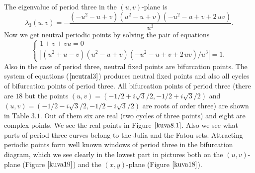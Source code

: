 \documentclass[12pt,a4paper]{amsart}
\numberwithin{equation}{section}
\numberwithin{lause}{section}
\begin{document}
The eigenvalue of period three in the $(u,v)$-plane is
\begin{displaymath}
\lambda_{3}(u,v)=-{\frac {\left (-{u}^{2}-u+v\right )\left
({u}^{2}-u+v\right )\left (- {u}^{2}-u+v+2\,uv\right )}{{u}^{3}}}.
\end{displaymath}
Now we get neutral periodic points by solving the pair of equations
\begin{equation}
\left\{\begin{array}{l}
      1+v+vu=0 \\
      |\left ({u}^{2}+u-v\right )\left
({u}^{2}-u+v\right )\left (- {u}^{2}-u+v+2\,uv\right )/{u}^{3}|=1.\label{neutral3}
\end{array}\right.
\end{equation}
 Also in the case of period three, neutral fixed points are bifurcation points. The system of equations ($\ref{neutral3}$) produces neutral fixed points and also all cycles of bifurcation points of period three. All bifurcation points of period three (there are $18$ but the points $(u,v)=(-1/2+i\sqrt{3}/2, -1/2+i\sqrt{3}/2)$ and $(u,v)=(-1/2-i\sqrt{3}/2, -1/2-i\sqrt{3}/2)$ are roots of order three) are shown in Table $3.1$. Out of them six are real (two cycles of three points) and eight are complex points. We see the real points in Figure $\ref{kuva8.1}$. Also we see what parts of period three curves belong to the Julia and the Fatou sets. Attracting periodic points form well known windows of period three in the bifurcation diagram, which we see clearly in the lowest part in pictures both on the $(u,v)$-plane (Figure $\ref{kuva19}$) and the $(x,y)$-plane (Figure $\ref{kuva18}$).
\end{document}

